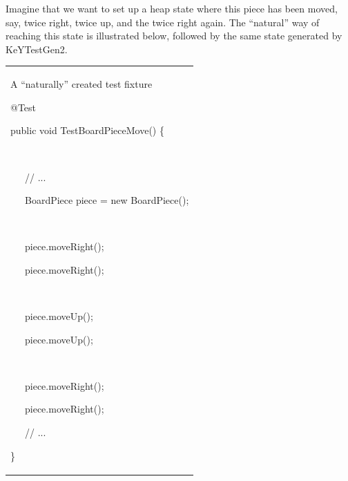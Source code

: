 \documentclass{article}
\newenvironment{tmindent}{\begin{tmparmod}{1.5em}{0pt}{0pt} }{\end{tmparmod}}
\newenvironment{tmparmod}[3]{\begin{list}{}{\setlength{\topsep}{0pt}\setlength{\leftmargin}{#1}\setlength{\rightmargin}{#2}\setlength{\parindent}{#3}\setlength{\listparindent}{\parindent}\setlength{\itemindent}{\parindent}\setlength{\parsep}{\parskip}} \item[]}{\end{list}}
\newenvironment{tmparsep}[1]{\begingroup\setlength{\parskip}{#1}}{\endgroup}
\begin{document}
Imagine that we want to set up a heap state where this piece has been moved,
say, twice right, twice up, and the twice right again. The ``natural'' way of
reaching this state is illustrated below, followed by the same state generated
by KeYTestGen2.



\begin{tmparmod}{1cm}{0pt}{0pt}
  \begin{tmparmod}{0pt}{1cm}{0pt}
    {\noindent}{\noindent}\begin{tabular}{l}
      \begin{example}
        A ``naturally'' created test fixture
        
        {\noindent}\begin{tmindent}
          \begin{tmparsep}{0em}
            @Test
            
            public void TestBoardPieceMove() \{
            
            \ \ \
            
            \ \ \ // ...
            
            \ \ \ BoardPiece piece = new BoardPiece();
            
            \ \ \
            
            \ \ \ piece.moveRight();
            
            \ \ \ piece.moveRight();
            
            \ \ \
            
            \ \ \ piece.moveUp();
            
            \ \ \ piece.moveUp();
            
            \ \ \
            
            \ \ \ piece.moveRight();
            
            \ \ \ piece.moveRight();
            
            \ \ \ // ...
            
            \}
          \end{tmparsep}
        \end{tmindent}{\hspace*{\fill}}{\medskip}
      \end{example}
    \end{tabular}{\hspace*{\fill}}{\smallskip}
  \end{tmparmod}
\end{tmparmod}
\end{document}
